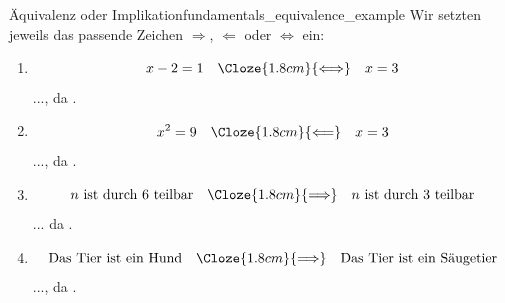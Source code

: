 \begin{ExampleBox}{Äquivalenz oder Implikation}{fundamentals_equivalence_example}
  Wir setzten jeweils das passende Zeichen $\Rightarrow$, $\Leftarrow$ oder $\Leftrightarrow$ ein:
  \begin{enumerate}[label=(\alph*),itemsep=0.9em]
    \item \[
      x-2=1
      \quad\Cloze{1.8cm}{\Longleftrightarrow}\quad
      x=3
      \]
      ..., da .

    \item \[
      x^2=9
      \quad\Cloze{1.8cm}{\Longleftarrow}\quad
      x=3
      \]
      ..., da .

    \item \[
      n\text{ ist durch }6\text{ teilbar}
      \quad\Cloze{1.8cm}{\Longrightarrow}\quad
      n\text{ ist durch }3\text{ teilbar}
      \]
      ... da .

    \item \[
      \text{Das Tier ist ein Hund}
      \quad\Cloze{1.8cm}{\Longrightarrow}\quad
      \text{Das Tier ist ein Säugetier}
      \]
      ..., da .
  \end{enumerate}
\end{ExampleBox}

